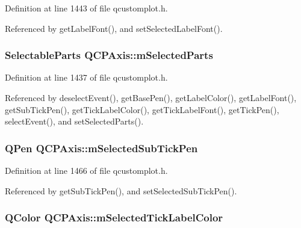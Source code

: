 Definition at line 1443 of file qcustomplot.\+h.



Referenced by get\+Label\+Font(), and set\+Selected\+Label\+Font().

\hypertarget{class_q_c_p_axis_a8f1eb0abfe2ae64652aa46b360e841e4}{}
\subsubsection[{m\+Selected\+Parts}]{\setlength{\rightskip}{0pt plus 5cm}Selectable\+Parts Q\+C\+P\+Axis\+::m\+Selected\+Parts\hspace{0.3cm}{\ttfamily [protected]}}\label{class_q_c_p_axis_a8f1eb0abfe2ae64652aa46b360e841e4}


Definition at line 1437 of file qcustomplot.\+h.



Referenced by deselect\+Event(), get\+Base\+Pen(), get\+Label\+Color(), get\+Label\+Font(), get\+Sub\+Tick\+Pen(), get\+Tick\+Label\+Color(), get\+Tick\+Label\+Font(), get\+Tick\+Pen(), select\+Event(), and set\+Selected\+Parts().

\hypertarget{class_q_c_p_axis_aa5cc6afc5dc2a365f5abbd36eb04a1dc}{}
\subsubsection[{m\+Selected\+Sub\+Tick\+Pen}]{\setlength{\rightskip}{0pt plus 5cm}Q\+Pen Q\+C\+P\+Axis\+::m\+Selected\+Sub\+Tick\+Pen\hspace{0.3cm}{\ttfamily [protected]}}\label{class_q_c_p_axis_aa5cc6afc5dc2a365f5abbd36eb04a1dc}


Definition at line 1466 of file qcustomplot.\+h.



Referenced by get\+Sub\+Tick\+Pen(), and set\+Selected\+Sub\+Tick\+Pen().

\hypertarget{class_q_c_p_axis_a3bcad40902f45dc4c991a2c3e4d31d70}{}
\subsubsection[{m\+Selected\+Tick\+Label\+Color}]{\setlength{\rightskip}{0pt plus 5cm}Q\+Color Q\+C\+P\+Axis\+::m\+Selected\+Tick\+Label\+Color\hspace{0.3cm}{\ttfamily [protected]}}\label{class_q_c_p_axis_a3bcad40902f45dc4c991a2c3e4d31d70}



